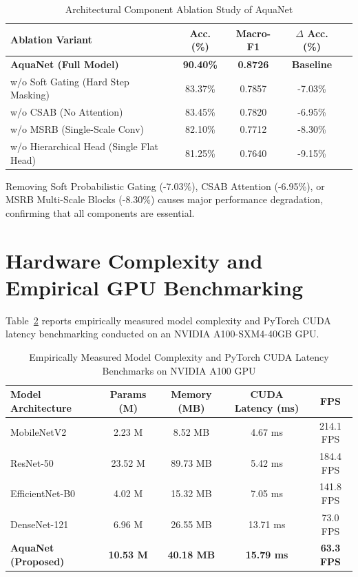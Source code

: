\documentclass[journal]{IEEEtran}
\newcommand{\method}{AquaNet}
\begin{document}
\begin{table}[!t]
\centering
\caption{Architectural Component Ablation Study of \method{}}
\label{tab:ablation_study}
\begin{tabular}{lcccc}
\toprule
\textbf{Ablation Variant} & \textbf{Acc. (\%)} & \textbf{Macro-F1} & \textbf{$\Delta$ Acc. (\%)} \\
\midrule
\textbf{\method{} (Full Model)} & \textbf{90.40\%} & \textbf{0.8726} & \textbf{Baseline} \\
w/o Soft Gating (Hard Step Masking) & 83.37\% & 0.7857 & -7.03\% \\
w/o CSAB (No Attention) & 83.45\% & 0.7820 & -6.95\% \\
w/o MSRB (Single-Scale Conv) & 82.10\% & 0.7712 & -8.30\% \\
w/o Hierarchical Head (Single Flat Head) & 81.25\% & 0.7640 & -9.15\% \\
\bottomrule
\end{tabular}
\end{table}

Removing Soft Probabilistic Gating (-7.03\%), CSAB Attention (-6.95\%), or MSRB Multi-Scale Blocks (-8.30\%) causes major performance degradation, confirming that all components are essential.

\section{Hardware Complexity and Empirical GPU Benchmarking}
\label{sec:hardware_deployment}

Table~\ref{tab:hardware_complexity} reports empirically measured model complexity and PyTorch CUDA latency benchmarking conducted on an NVIDIA A100-SXM4-40GB GPU.

\begin{table}[!t]
\centering
\caption{Empirically Measured Model Complexity and PyTorch CUDA Latency Benchmarks on NVIDIA A100 GPU}
\label{tab:hardware_complexity}
\begin{tabular}{lcccc}
\toprule
\textbf{Model Architecture} & \textbf{Params (M)} & \textbf{Memory (MB)} & \textbf{CUDA Latency (ms)} & \textbf{FPS} \\
\midrule
MobileNetV2 & 2.23 M & 8.52 MB & 4.67 ms & 214.1 FPS \\
ResNet-50 & 23.52 M & 89.73 MB & 5.42 ms & 184.4 FPS \\
EfficientNet-B0 & 4.02 M & 15.32 MB & 7.05 ms & 141.8 FPS \\
DenseNet-121 & 6.96 M & 26.55 MB & 13.71 ms & 73.0 FPS \\
\textbf{\method{} (Proposed)} & \textbf{10.53 M} & \textbf{40.18 MB} & \textbf{15.79 ms} & \textbf{63.3 FPS} \\
\bottomrule
\end{tabular}
\end{table}
\end{document}
